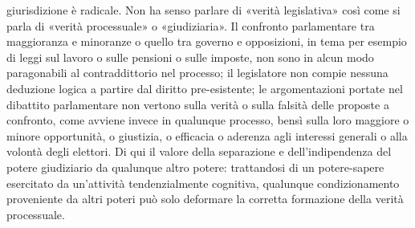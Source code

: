 giurisdizione è radicale. Non ha senso parlare di «verità legislativa» così come si parla di «verità processuale» o «giudiziaria». Il confronto parlamentare tra maggioranza e minoranze o quello tra governo e opposizioni, in tema per esempio di leggi sul lavoro o sulle pensioni o sulle imposte, non sono in alcun modo paragonabili al contraddittorio nel processo; il legislatore non compie nessuna deduzione logica a partire dal diritto pre-esistente; le argomentazioni portate nel dibattito parlamentare non vertono sulla verità o sulla falsità delle proposte a confronto, come avviene invece in qualunque processo, bensì sulla loro maggiore o minore opportunità, o giustizia, o efficacia o aderenza agli interessi generali o alla volontà degli elettori. Di qui il valore della separazione e dell’indipendenza del potere giudiziario da qualunque altro potere: trattandosi di un potere-sapere esercitato da un’attività tendenzialmente cognitiva, qualunque condizionamento proveniente da altri poteri può solo deformare la corretta formazione della verità processuale.

